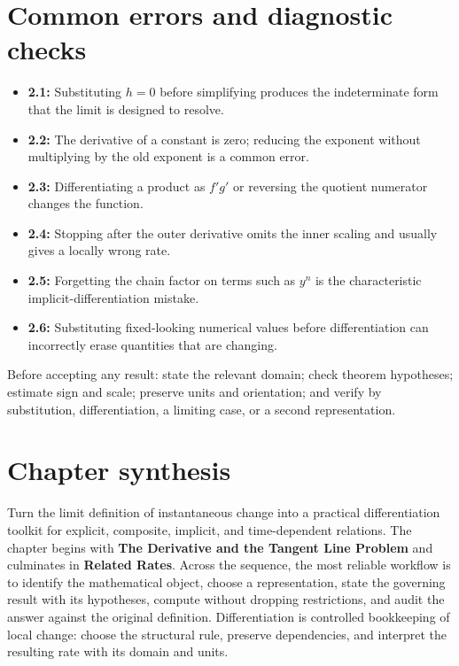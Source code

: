 \documentclass[11pt]{article}
\begin{document}
\section{Common errors and diagnostic checks}
\begin{warningbox}
\begin{itemize}
\item \textbf{2.1:} Substituting $h=0$ before simplifying produces the indeterminate form that the limit is designed to resolve.
\item \textbf{2.2:} The derivative of a constant is zero; reducing the exponent without multiplying by the old exponent is a common error.
\item \textbf{2.3:} Differentiating a product as $f'g'$ or reversing the quotient numerator changes the function.
\item \textbf{2.4:} Stopping after the outer derivative omits the inner scaling and usually gives a locally wrong rate.
\item \textbf{2.5:} Forgetting the chain factor on terms such as $y^n$ is the characteristic implicit-differentiation mistake.
\item \textbf{2.6:} Substituting fixed-looking numerical values before differentiation can incorrectly erase quantities that are changing.
\end{itemize}
\end{warningbox}
\begin{checkbox}
Before accepting any result: state the relevant domain; check theorem hypotheses; estimate sign and scale; preserve units and orientation; and verify by substitution, differentiation, a limiting case, or a second representation.
\end{checkbox}

\section{Chapter synthesis}
Turn the limit definition of instantaneous change into a practical differentiation toolkit for explicit, composite, implicit, and time-dependent relations. The chapter begins with \textbf{The Derivative and the Tangent Line Problem} and culminates in \textbf{Related Rates}. Across the sequence, the most reliable workflow is to identify the mathematical object, choose a representation, state the governing result with its hypotheses, compute without dropping restrictions, and audit the answer against the original definition. Differentiation is controlled bookkeeping of local change: choose the structural rule, preserve dependencies, and interpret the resulting rate with its domain and units.
\end{document}

